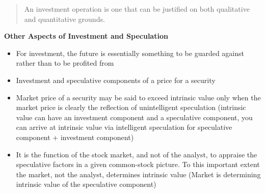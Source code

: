 \documentclass{article}
\begin{document}
\par
\begin{quote}
An investment operation is one that can be justified on both qualitative and quantitative grounds.
\end{quote}
\textbf{Other Aspects of Investment and Speculation}
\begin{itemize}
\item For investment, the future is essentially something to be guarded against rather than to be profited from
\item Investment and speculative components of a price for a security
\item Market price of a security may be said to exceed intrinsic value only when the market price is clearly the reflection of unintelligent speculation (intrinsic value can have an investment component and a speculative component, you can arrive at intrinsic value via intelligent speculation for speculative component + investment component)
\item It is the function of the stock market, and not of the analyst, to appraise the speculative factors in a given common-stock picture. To this important extent the market, not the analyst, determines intrinsic value (Market is determining intrinsic value of the speculative component)
\end{itemize}
\end{document}
